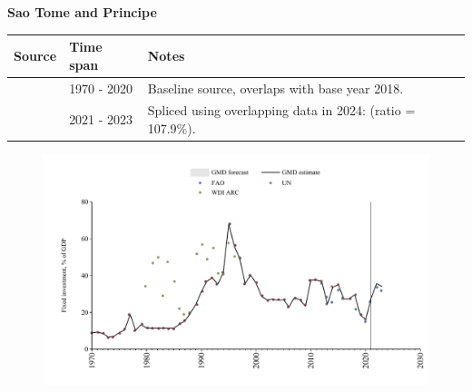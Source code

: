 \documentclass[12pt,a4paper,landscape]{article}
\begin{document}
\begin{adjustbox}{max totalsize={\paperwidth}{\paperheight},center}
\begin{minipage}[t][\textheight][t]{\textwidth}
\vspace*{0.5cm}
{}
\begin{center}
{\Large\bfseries Sao Tome and Principe}
\end{center}
\vspace{0.5cm}
\begin{table}[H]
\centering
\small
\begin{tabular}{|l|l|l|}
\hline
\textbf{Source} & \textbf{Time span} & \textbf{Notes} \\
\hline
\rowcolor{white}\cite{UN}& 1970 - 2020 &Baseline source, overlaps with base year 2018.\\
\rowcolor{lightgray}\cite{FAO}& 2021 - 2023 &Spliced using overlapping data in 2024: (ratio = 107.9\%).\\
\hline
\end{tabular}
\end{table}
\begin{figure}[H]
\centering
\includegraphics[width=\textwidth,height=0.6\textheight,keepaspectratio]{graphs/STP_finv_GDP.pdf}
\end{figure}
\end{minipage}
\end{adjustbox}
\end{document}
